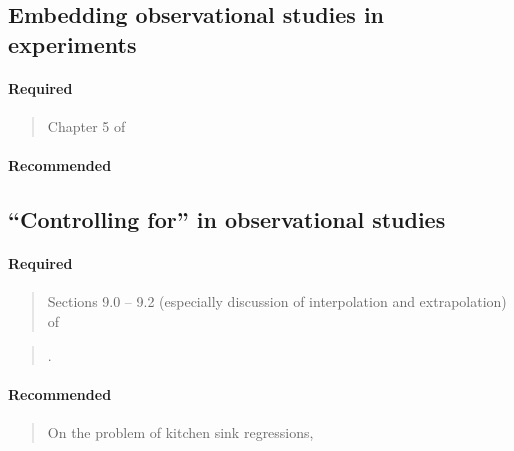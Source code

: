 \documentclass[12pt]{article}
\newcommand{\bibverse}[1]{\begin{verse} \bibentry{#1}. \end{verse}}
\begin{document}
\begin{verse}  \end{verse}

\subsection{Embedding observational studies in experiments}

\paragraph*{Required}

\begin{verse} Chapter 5 of  \end{verse}

\paragraph*{Recommended}

\begin{verse}  \end{verse}

\begin{verse}  \end{verse}

\subsection{``Controlling for'' in observational studies}

\paragraph*{Required}

\begin{verse} Sections 9.0 -- 9.2 (especially discussion of interpolation and extrapolation) of  \end{verse}

\bibverse{berk2010}

\paragraph*{Recommended}

\begin{verse} On the problem of kitchen sink regressions,  \end{verse}
\end{document}
